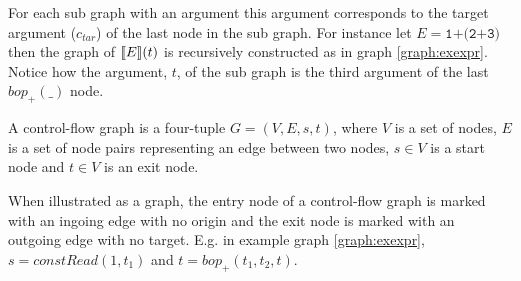 For each sub graph with an argument this argument corresponds to the target argument ($c_{tar}$) of the last node in the sub graph. For instance let $E = \texttt{1+(2+3)}$ then the graph of $\llbracket E\rrbracket(t)$ is recursively constructed as in graph \ref{graph:exexpr}. Notice how the argument, $t$, of the sub graph is the third argument of the last $\mathit{bop}_+(\_)$ node.

\begin{definition}
\label{def:cfg}
A control-flow graph is a four-tuple $G = (V, E, s, t)$, where $V$ is a set of nodes, $E$ is a set of node pairs representing an edge between two nodes, $s\in V$ is a start node and $t\in V$ is an exit node.
\end{definition}

When illustrated as a graph, the entry node of a control-flow graph is marked with an ingoing edge with no origin and the exit node is marked with an outgoing edge with no target. E.g. in example graph \ref{graph:exexpr}, $s = \mathit{constRead}(1, t_1)$ and $t = \mathit{bop}_+(t_1, t_2, t)$.

